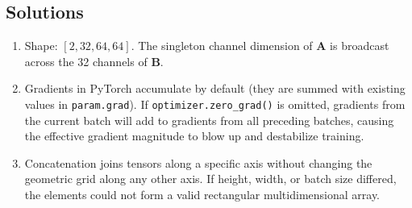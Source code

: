 \subsection*{Solutions}
\begin{enumerate}
    \item Shape: $[2, 32, 64, 64]$. The singleton channel dimension of $\mathbf{A}$ is broadcast across the 32 channels of $\mathbf{B}$.
    \item Gradients in PyTorch accumulate by default (they are summed with existing values in \texttt{param.grad}). If \texttt{optimizer.zero\_grad()} is omitted, gradients from the current batch will add to gradients from all preceding batches, causing the effective gradient magnitude to blow up and destabilize training.
    \item Concatenation joins tensors along a specific axis without changing the geometric grid along any other axis. If height, width, or batch size differed, the elements could not form a valid rectangular multidimensional array.
\end{enumerate}
